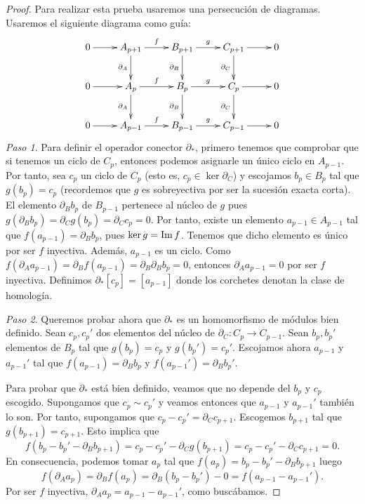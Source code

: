 \begin{proof}
	Para realizar esta prueba usaremos una persecución de diagramas. Usaremos el
	siguiente diagrama como guía:
	\[
	\xymatrix{ 0 \ar@{->}[r] & A_{p+1} \ar@{->}[r]^{f} \ar@{->}[d]_{\partial_A} & B_{p+1} \ar@{->}[r]^{g} \ar@{->}[d]_{\partial_B} & C_{p+1} \ar@{->}[r] \ar@{->}[d]_{\partial_C} & 0 \\ 0 \ar@{->}[r] & A_p \ar@{->}[r]^{f} \ar@{->}[d]_{\partial_A} & B_p \ar@{->}[r]^{g} \ar@{->}[d]_{\partial_B} & C_p \ar@{->}[r] \ar@{->}[d]_{\partial_C} & 0 \\ 0 \ar@{->}[r] & A_{p-1} \ar@{->}[r]^{f} & B_{p-1} \ar@{->}[r]^{g} & C_{p-1} \ar@{->}[r] & 0 }
	\]
	\textit{Paso 1}. Para definir el operador conector \(\partial_{*}\), primero
	tenemos que comprobar que si tenemos un ciclo de \(C_{p}\), entonces podemos asignarle
	un único ciclo en \(A_{p-1}\). Por tanto, sea \(c_{p}\) un ciclo de \(C_{p}\) (esto
	es, \(c_{p}\in \ker \partial_{C}\)) y escojamos \(b_{p}\in B_{p}\) tal que
	\(g(b_{p}) = c_{p}\) (recordemos que \(g\) es sobreyectiva por ser la sucesión exacta
	corta). El elemento \(\partial_{B}b_{p}\) de \(B_{p-1}\) pertenece al núcleo de \(g\)
	pues \(g(\partial_{B}b_{p})=\partial_{C}g(b_{p})=\partial_{C}c_{p}=0\). Por
	tanto, existe un elemento \(a_{p-1}\in A_{p-1}\) tal que \(f(a_{p-1})=\partial_{B}
	b_{p}\), pues \(\ker g = \operatorname{Im} f\). Tenemos que dicho elemento es único por ser \(f\)
	inyectiva. Además, \(a_{p-1}\) es un ciclo. Como
	\(f(\partial_{A}a_{p-1}) = \partial_{B}f(a_{p-1}) = \partial_{B}\partial_{B}b_{p}
	= 0\), entonces \(\partial_{A}a_{p-1}= 0\) por ser \(f\) inyectiva. Definimos
	\(\partial_{*}[c_{p}] = [a_{p-1}]\) donde los corchetes denotan la clase de
	homología.
	
	\textit{Paso 2}. Queremos probar ahora que \(\partial_{*}\) es un homomorfismo
	de módulos bien definido. Sean \(c_{p}, c_{p}'\) dos elementos del núcleo de \(\partial
	_{C}: C_{p}\to C_{p-1}\). Sean \(b_{p}, b_{p}'\) elementos de \(B_{p}\) tal que
	\(g(b_{p}) = c_{p}\) y \(g(b_{p}')=c_{p}'\). Escojamos ahora \(a_{p-1}\) y \(a_{p-1}'\)
	tal que \(f(a_{p-1}) = \partial_{B}b_{p}\) y \(f(a_{p-1}') = \partial_{B}b_{p}'\).
	
	Para probar que \(\partial_{*}\) está bien definido, veamos que no depende del
	\(b_{p}\) y \(c_{p}\) escogido. Supongamos que \(c_{p}\sim c_{p}'\) y veamos entonces
	que \(a_{p-1}\) y \(a_{p-1}'\) también lo son. Por tanto, supongamos que \(c_{p}- c_{p}
	' = \partial_{C}c_{p+1}\). Escogemos \(b_{p+1}\) tal que \(g(b_{p+1}) = c_{p+1}\). Esto
	implica que
	\[
	f(b_{p}- b_{p}' - \partial_{B}b_{p+1}) = c_{p}- c_{p}' - \partial_{C}g(b_{p+1}
	) = c_{p}- c_{p}' - \partial_{C}c_{p+1}= 0.
	\]
	En consecuencia, podemos tomar \(a_{p}\) tal que
	\(f(a_{p}) = b_{p}- b_{p}' - \partial_{B}b_{p+1}\) luego
	\[
	f(\partial_{A}a_{p}) = \partial_{B}f(a_{p}) = \partial_{B}(b_{p}- b_{p}') - 0
	= f(a_{p-1}- a_{p-1}').
	\]
	Por ser \(f\) inyectiva, \(\partial_{A}a_{p}= a_{p-1}- a_{p-1}'\), como buscábamos.
	

\end{proof}

